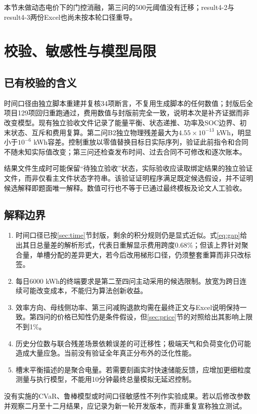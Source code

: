 \documentclass[UTF8,a4paper,zihao=-4,fontset=fandol]{ctexart}
\begin{document}
本节未做动态电价下的门控消融，第三问的500元阈值没有迁移；result4-2与result4-3两份Excel也尚未按本轮口径重导。

\section{校验、敏感性与模型局限}
\subsection{已有校验的含义}
时间口径由独立脚本重建并复核34项断言，不复用生成脚本的任何数值；封版后全项目129项回归重跑通过，费用数值与封版前完全一致，说明本次是补齐证据而非改变模型。现有独立验收文件记录了能量平衡、状态递推、功率及SOC边界、初末状态、互斥和费用复算。第二问B2独立物理残差最大为$4.55\times10^{-13}$ kWh，明显小于$10^{-6}$ kWh容差。控制重放以零值替换目标日实际序列，验证此前指令和合同不随未知实际值改变；第三问还检查发布时间、过去合同不可修改和逐次账本。

结果文件生成时可能保留“待独立验收”状态，实际验收应读取绑定结果的独立验证文件，而非仅看主文件状态字符串。该验证证明程序满足既定候选假设，并不证明候选解释即题面唯一解释。数值可行也不等于已通过最终模板及论文人工验收。

\subsection{解释边界}
\begin{enumerate}
\item 时间口径已按\ref{sec:time}节封版，剩余的积分规则仍是显式近似。式\eqref{eq:gap}给出其日总量差的解析形式，代表日重解显示费用跨度0.68\%；但该上界针对聚合量，单槽分配的差异更大，若今后改用梯形口径，仍须整套重算而非只改标签。
\item 每日6000 kWh的终端要求是第二至四问主动采用的候选限制。放宽为跨日连续可能改变成本，不能归为算法创新收益。
\item 效率方向、母线侧功率、第三问减购退款均需在最终正文与Excel说明保持一致。第四问的价格已知性仍是条件假设，但\ref{sec:price}节的对照给出其影响上限不到1\%。
\item 历史分位数与联合残差场景依赖误差的可迁移性；极端天气和负荷变化仍可能造成大量应急。当前没有验证全年真正分布外的泛化性能。
\item 槽末平衡描述的是聚合电量。若需要刻画实时快速储能反馈，应增加更细粒度测量与执行模型，不能用10分钟最终总量模拟无延迟控制。
\end{enumerate}
没有实施的CVaR、鲁棒模型或时间口径敏感性不列作实验成果。若以后修改参数并观察二月至十二月结果，应记录为新一轮开发版本，而非重复宣称独立测试。
\end{document}
